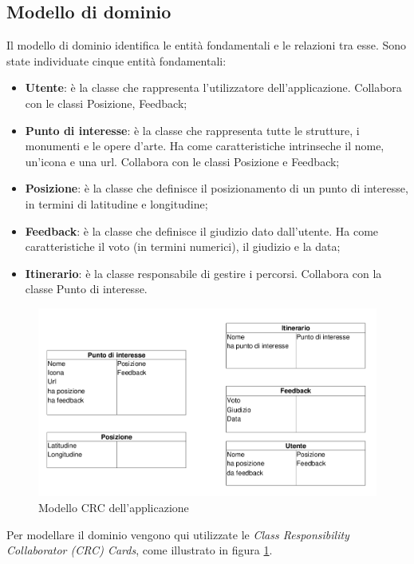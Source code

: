 \subsection{Modello di dominio}
Il modello di dominio identifica le entità fondamentali e le relazioni tra esse.
Sono state individuate cinque entità fondamentali:
\begin{itemize}
\item \textbf{Utente}: è la classe che rappresenta l'utilizzatore dell'applicazione. Collabora con le classi Posizione, Feedback;
\item \textbf{Punto di interesse}: è la classe che rappresenta tutte le strutture, i monumenti e le opere d'arte. Ha come caratteristiche intrinseche il nome, un'icona e una url. Collabora con le classi Posizione e Feedback;
\item \textbf{Posizione}: è la classe che definisce il posizionamento di un punto di interesse, in termini di latitudine e longitudine;
\item \textbf{Feedback}: è la classe che definisce il giudizio dato dall'utente. Ha come caratteristiche il voto (in termini numerici), il giudizio e la data;
\item \textbf{Itinerario}: è la classe responsabile di gestire i percorsi. Collabora con la classe Punto di interesse.
\end{itemize}
\begin{figure}
\begin{center}
\includegraphics[scale=0.55]{imgs/model/crcmodel.png}
\caption{Modello CRC dell'applicazione\label{crcmodel}}
\end{center}
\end{figure}
Per modellare il dominio vengono qui utilizzate le \textit{Class Responsibility Collaborator (CRC) Cards}, come illustrato in figura \ref{crcmodel}.

